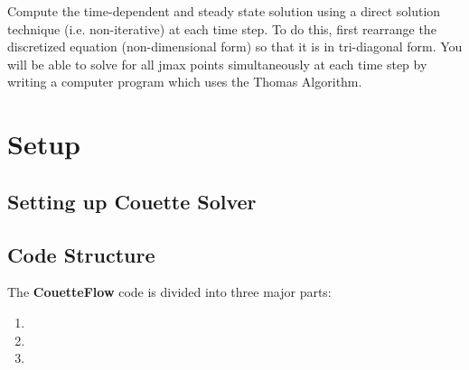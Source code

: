 \documentclass[letterpaper,10pt,english]{sphinxmanual}
\begin{document}
Compute the time-dependent and steady state solution using a direct solution technique (i.e. non-iterative) at each time step. To do this, first rearrange the discretized equation (non-dimensional form) so that it is in tri-diagonal form. You will be able to solve for all jmax points simultaneously at each time step by writing a computer program which uses the Thomas Algorithm.


\section{Setup}
\label{\detokenize{setup:setup-couetteflow}}\label{\detokenize{setup:setup}}\label{\detokenize{setup::doc}}

\subsection{Setting up Couette Solver}
\label{\detokenize{setup:setting-up-couette-solver}}\label{\detokenize{setup:id1}}

\subsection{Code Structure}
\label{\detokenize{setup:code-structure}}\label{\detokenize{setup:structure}}
The {\color{red}\bfseries{}\textbar{}CouetteFlow\textbar{}} code is divided into three major parts:
\begin{enumerate}
\item {} 

\item {} 

\item {} 

\end{enumerate}
\end{document}
